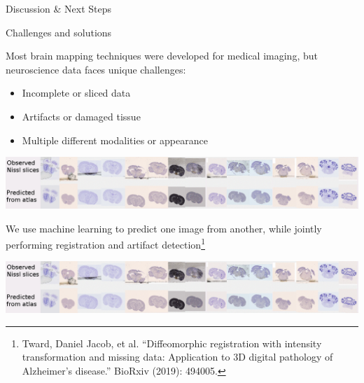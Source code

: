 \documentclass{beamer}
\begin{document}
\begin{frame}{Discussion \& Next Steps}
\end{frame}



\begin{frame}{Challenges and solutions}

Most brain mapping techniques were developed for medical imaging, but  neuroscience data faces unique challenges:


\begin{itemize}


\item 
Incomplete or sliced data

\item 
Artifacts or damaged tissue

\item 
Multiple different modalities or appearance

\end{itemize}

\includegraphics[width=\textwidth,clip,trim=0in 1.3in 0in 0in]{720exampleslices-edit}

\vspace{1em}

We use machine learning to predict one image from another, while \alert{jointly} performing registration and artifact detection\footnote{ Tward, Daniel Jacob, et al. ``Diffeomorphic registration with intensity transformation and missing data: Application to 3D digital pathology of Alzheimer's disease.'' BioRxiv (2019): 494005.}

\vspace{1em}
\includegraphics[width=\textwidth,clip,trim=0in 0in 0in 1.3in]{720exampleslices-edit}


\end{frame}
\end{document}

